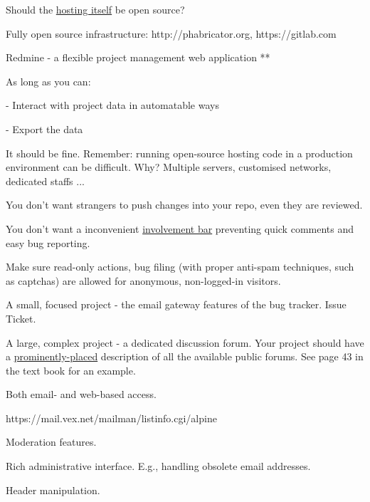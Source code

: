 \documentclass[landscape,30pt]{foils}
\begin{document}

Should the \underline{hosting itself} be open source?

Fully open source infrastructure: http://phabricator.org, https://gitlab.com

Redmine - a flexible project management web application ** 

As long as you can:

- Interact with project data in automatable ways

- Export the data

It should be fine.  Remember: running open-source hosting code in a production environment can be difficult.  Why? Multiple servers,
customised networks, dedicated staffs ...


You don't want strangers to push changes into your repo, even they are reviewed.

You don't want a inconvenient \underline{involvement bar} preventing quick comments and easy bug reporting.

Make sure read-only actions, bug filing (with proper anti-spam techniques, such as captchas) are allowed for anonymous, non-logged-in visitors.  


A small, focused project - the email gateway features of the bug tracker. Issue Ticket.

A large, complex project - a dedicated discussion forum.  Your project should have a \underline{prominently-placed} description of all the available public forums.  See page 43 in the text book for an example.


Both email- and web-based access.

https://mail.vex.net/mailman/listinfo.cgi/alpine

Moderation features. 

Rich administrative interface.  E.g., handling obsolete email addresses.

Header manipulation.
\end{document}
